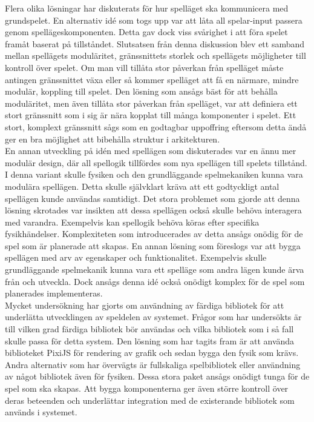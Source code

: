 Flera olika lösningar har diskuterats för hur spelläget ska kommunicera med grundspelet. En alternativ idé som togs upp var att låta all spelar-input passera genom spellägeskomponenten. Detta gav dock viss svårighet i att föra spelet framåt baserat på tillståndet. Slutsatsen från denna diskussion blev ett samband mellan spellägets moduläritet, gränssnittets storlek och spellägets möjligheter till kontroll över spelet. Om man vill tillåta stor påverkan från spelläget måste antingen gränssnittet växa eller så kommer spelläget att få en närmare, mindre modulär, koppling till spelet. Den lösning som ansågs bäst för att behålla moduläritet, men även tillåta stor påverkan från spelläget, var att definiera ett stort gränssnitt som i sig är nära kopplat till många komponenter i spelet. Ett stort, komplext gränssnitt sågs som en godtagbar uppoffring eftersom detta ändå ger en bra möjlighet att bibehålla struktur i arkitekturen.\\

En annan utveckling på idén med spellägen som diskuterades var en ännu mer modulär design, där all spellogik tillfördes som nya spellägen till spelets tillstånd. I denna variant skulle fysiken och den grundläggande spelmekaniken kunna vara modulära spellägen. Detta skulle självklart kräva att ett godtyckligt antal spellägen kunde användas samtidigt. Det stora problemet som gjorde att denna lösning skrotades var insikten att dessa spellägen också skulle behöva interagera med varandra. Exempelvis kan spellogik behöva köras efter specifika fysikhändelser. Komplexiteten som introducerades av detta ansågs onödig för de spel som är planerade att skapas. En annan lösning som föreslogs var att bygga spellägen med arv av egenskaper och funktionalitet. Exempelvis skulle grundläggande spelmekanik kunna vara ett spelläge som andra lägen kunde ärva från och utveckla. Dock ansågs denna idé också onödigt komplex för de spel som planerades implementeras.\\

Mycket undersökning har gjorts om användning av färdiga bibliotek för att underlätta utvecklingen av speldelen av systemet. Frågor som har undersökts är till vilken grad färdiga bibliotek bör användas och vilka bibliotek som i så fall skulle passa för detta system. Den lösning som har tagits fram är att använda biblioteket PixiJS\cite{bib-pixi} för rendering av grafik och sedan bygga den fysik som krävs. Andra alternativ som har övervägts är fullskaliga spelbibliotek eller användning av något bibliotek även för fysiken. Dessa stora paket ansågs onödigt tunga för de spel som ska skapas. Att bygga komponenterna ger även större kontroll över deras beteenden och underlättar integration med de existerande bibliotek som används i systemet.\\
